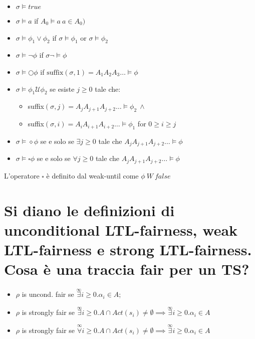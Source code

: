 \documentclass[a4paper,11pt]{article}
\newcommand{\until}{\mathcal{U}}
\begin{document}
	\begin{itemize}
		\item $\sigma \models true$
		\item $\sigma \models a$ if $A_0 \models a\ a \in A_0)$
		\item $\sigma \models \phi_1 \vee \phi_2 $ if $\sigma \models \phi_1$ or $\sigma \models \phi_2$
		\item $\sigma \models \neg\phi$ if $\sigma \neg\models \phi$
		\item $\sigma \models \bigcirc	\phi$ if $\text{suffix}(\sigma, 1) = A_1A_2A_3 \dots \models \phi$
		\item $\sigma \models \phi_1 \until \phi_2$ se esiste $j\geq 0$ tale che:\begin{itemize}
			\item suffix$(\sigma, j) = A_jA_{j+1}A_{j+2} \dots \models \phi_2\ \wedge$
			\item suffix$(\sigma, i) = A_iA_{i+1}A_{i+2} \dots \models \phi_1$ for $0 \geq i \geq j$
		\end{itemize}
		\item $\sigma \models \diamond \phi$ se e solo se $\exists j\geq 0$ tale che $A_jA_{j+1}A_{j+2} \dots \models \phi$
		\item  $\sigma \models \square \phi $ se e solo se $\forall j\geq 0$ tale che $A_jA_{j+1}A_{j+2} \dots \models \phi$
	\end{itemize}

	L'operatore $\square$ è  definito dal weak-until come $\phi\ W\ false$

	\section{Si diano le definizioni di unconditional LTL-fairness, weak LTL-fairness e strong LTL-fairness. Cosa è una traccia fair per un TS?}

	\begin{itemize}
		\item $\rho$ is uncond. fair se $\overset{\infty}{\exists} i \geq 0 . \alpha_i \in A$;
		\item $\rho$ is strongly fair se $\overset{\infty}{\exists} i \geq 0. A \cap Act(s_i) \neq \emptyset \implies \overset{\infty}{\exists} i \geq 0. \alpha_i \in A$
		\item $\rho$ is strongly fair se $\overset{\infty}{\forall} i \geq 0. A \cap Act(s_i) \neq \emptyset \implies \overset{\infty}{\exists} i \geq 0. \alpha_i \in A$
	\end{itemize}
\end{document}

